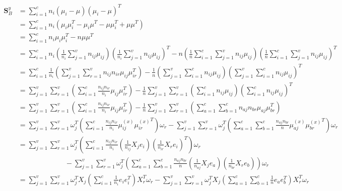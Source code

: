 \begin{appendix}
    \begin{equation}
        \begin{split}
            \boldsymbol{S}^y_B &= \sum_{i=1}^{c}n_i\left(\mu_i - \mu\right)\left(\mu_i - \mu\right)^T \\
            &= \sum_{i=1}^{c}n_i\left(\mu_i\mu_i^T - \mu_i\mu^T - \mu\mu_i^T + \mu\mu^T\right) \\
            &= \sum_{i=1}^{c}n_i\mu_i\mu_i^T - n\mu\mu^T \\
            &= \sum_{i=1}^{c}n_i\left(\frac{1}{n_i}\sum_{j=1}^{v}n_{ij}\mu_{ij}\right)\left(\frac{1}{n_i}\sum_{j=1}^{v}n_{ij}\mu_{ij}\right)^T - n\left(\frac{1}{n}\sum_{i=1}^{c}\sum_{j=1}^{v}n_{ij}\mu_{ij}\right)\left(\frac{1}{n}\sum_{i=1}^{c}\sum_{j=1}^{v}n_{ij}\mu_{ij}\right)^T \\
            &= \sum_{i=1}^{c}\frac{1}{n_i}\left(\sum_{j=1}^{v}\sum_{r=1}^{v}n_{ij}n_{ir}\mu_{ij}\mu_{ir}^T\right) - \frac{1}{n}\left(\sum_{j=1}^{v}\sum_{i=1}^{c}n_{ij}\mu_{ij}\right)\left(\sum_{j=1}^{v}\sum_{i=1}^{c}n_{ij}\mu_{ij}\right)^T \\
            &= \sum_{j=1}^{v}\sum_{r=1}^{v}\left(\sum_{i=1}^{c}\frac{n_{ij}n_{ir}}{n_i}\mu_{ij}\mu_{ir}^T\right) - \frac{1}{n}\sum_{j=1}^{v}\sum_{r=1}^{v}\left(\sum_{i=1}^{c}n_{ij}\mu_{ij}\right)\left(\sum_{i=1}^{c}n_{ij}\mu_{ij}\right)^T \\
            &= \sum_{j=1}^{v}\sum_{r=1}^{v}\left(\sum_{i=1}^{c}\frac{n_{ij}n_{ir}}{n_i}\mu_{ij}\mu_{ir}^T\right) - \frac{1}{n}\sum_{j=1}^{v}\sum_{r=1}^{v}\left(\sum_{a=1}^{c}\sum_{b=1}^{c}n_{aj}n_{br}\mu_{aj}\mu_{br}^T\right) \\
            &= \sum_{j=1}^{v}\sum_{r=1}^{v}\omega_j^T\left(\sum_{i=1}^{c}\frac{n_{ij}n_{ir}}{n_i}\mu^{(x)}_{ij}{\mu^{(x)}_{ir}}^T\right)\omega_r - \sum_{j=1}^{v}\sum_{r=1}^{v}\omega_j^T\left(\sum_{a=1}^{c}\sum_{b=1}^{c}\frac{n_{aj}n_{br}}{n}\mu^{(x)}_{aj}{\mu^{(x)}_{br}}^T\right)\omega_r \\
            &= \sum_{j=1}^{v}\sum_{r=1}^{v}\omega_j^T\left(\sum_{i=1}^{c}\frac{n_{ij}n_{ir}}{n_i}\left(\frac{1}{n_{ij}}X_j e_i\right)\left(\frac{1}{n_{ir}}X_r e_i\right)^T\right)\omega_r \\
            &\ \ \ \ \ \ \ \ \ \ \ \ \ \ \ \ \ \ \ \ \ \ \ \ \ \ \ \ \ \  - \sum_{j=1}^{v}\sum_{r=1}^{v}\omega_j^T\left(\sum_{a=1}^{c}\sum_{b=1}^{c}\frac{n_{aj}n_{br}}{n}\left(\frac{1}{n_{aj}}X_j e_a\right)\left(\frac{1}{n_{br}}X_r e_b\right)\right)\omega_r \\
            &= \sum_{j=1}^{v}\sum_{r=1}^{v}\omega_j^T X_j\left(\sum_{i=1}^{c}\frac{1}{n_i}e_i e_i^T\right)X_r^T\omega_r - \sum_{j=1}^{v}\sum_{r=1}^{v}\omega_j^T X_j\left(\sum_{a=1}^{c}\sum_{b=1}^{c}\frac{1}{n}e_a e_b^T\right)X_r^T\omega_r \\

\end{split}
\end{equation}
\end{appendix}
